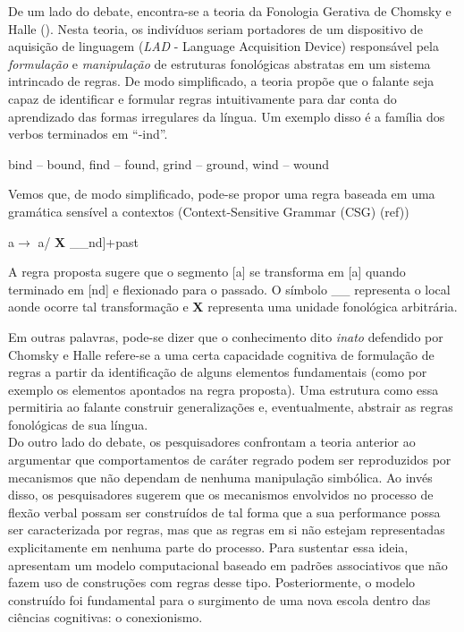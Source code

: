 

De um lado do debate, encontra-se a teoria da Fonologia Gerativa de Chomsky e Halle (\citeyear{chomsky:1968}). Nesta teoria, os indivíduos seriam portadores de um dispositivo de aquisição de linguagem (\textit{LAD} - Language Acquisition Device) responsável pela \textit{formulação} e \textit{manipulação} de estruturas fonológicas abstratas em um sistema intrincado de regras. De modo simplificado, a teoria propõe que o falante seja capaz de identificar e formular regras intuitivamente para dar conta do aprendizado das formas irregulares da língua. Um exemplo disso é a família dos verbos terminados em “-ind”.

\begin{center}
bind – bound, find – found, grind – ground, wind – wound
\end{center}

Vemos que, de modo simplificado, pode-se propor uma regra baseada em uma gramática sensível a contextos (Context-Sensitive Grammar (CSG) (ref)) 

\begin{center}
a\textsci $\rightarrow$ a\textupsilon / \textbf{X}  \_\_nd]+past
\end{center}

A regra proposta sugere que o segmento [a\textsci] se transforma em [a\textupsilon] quando terminado em [nd] e flexionado para o passado. O símbolo \_\_ representa o local aonde ocorre tal transformação e \textbf{X} representa uma unidade fonológica arbitrária. 

Em outras palavras, pode-se dizer que o conhecimento dito \textit{inato} defendido por Chomsky e Halle refere-se a uma certa capacidade cognitiva de formulação de regras a partir da identificação de alguns elementos fundamentais (como por exemplo os elementos apontados na regra proposta). Uma estrutura como essa permitiria ao falante construir generalizações e, eventualmente, abstrair as regras fonológicas de sua língua. \\

Do outro lado do debate, os pesquisadores \cite{rumelhart:1986} confrontam a teoria anterior ao argumentar que comportamentos de caráter regrado podem ser reproduzidos por mecanismos que não dependam de nenhuma manipulação simbólica. Ao invés disso, os pesquisadores sugerem que os mecanismos envolvidos no processo de flexão verbal possam ser construídos de tal forma que a sua performance possa ser caracterizada por regras, mas que as regras em si não estejam representadas explicitamente em nenhuma parte do processo. Para sustentar essa ideia, \cite{rumelhart:1986} apresentam um modelo computacional baseado em padrões associativos que não fazem uso de construções com regras desse tipo. Posteriormente, o modelo construído foi fundamental para o surgimento de uma nova escola dentro das ciências cognitivas: o conexionismo.\\

